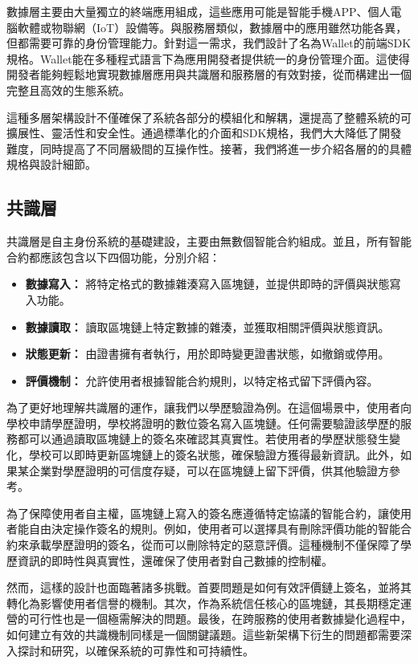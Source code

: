 數據層主要由大量獨立的終端應用組成，這些應用可能是智能手機APP、個人電腦軟體或物聯網（IoT）設備等。與服務層類似，數據層中的應用雖然功能各異，但都需要可靠的身份管理能力。針對這一需求，我們設計了名為Wallet的前端SDK規格。Wallet能在多種程式語言下為應用開發者提供統一的身份管理介面。這使得開發者能夠輕鬆地實現數據層應用與共識層和服務層的有效對接，從而構建出一個完整且高效的生態系統。

這種多層架構設計不僅確保了系統各部分的模組化和解耦，還提高了整體系統的可擴展性、靈活性和安全性。通過標準化的介面和SDK規格，我們大大降低了開發難度，同時提高了不同層級間的互操作性。接著，我們將進一步介紹各層的的具體規格與設計細節。
\subsection{共識層}
共識層是自主身份系統的基礎建設，主要由無數個智能合約組成。並且，所有智能合約都應該包含以下四個功能，分別介紹：
\begin{itemize}
  \item \textbf{數據寫入：} 將特定格式的數據雜湊寫入區塊鏈，並提供即時的評價與狀態寫入功能。
  \item \textbf{數據讀取：} 讀取區塊鏈上特定數據的雜湊，並獲取相關評價與狀態資訊。
  \item \textbf{狀態更新：} 由證書擁有者執行，用於即時變更證書狀態，如撤銷或停用。
  \item \textbf{評價機制：} 允許使用者根據智能合約規則，以特定格式留下評價內容。
\end{itemize}
為了更好地理解共識層的運作，讓我們以學歷驗證為例。在這個場景中，使用者向學校申請學歷證明，學校將證明的數位簽名寫入區塊鏈。任何需要驗證該學歷的服務都可以通過讀取區塊鏈上的簽名來確認其真實性。若使用者的學歷狀態發生變化，學校可以即時更新區塊鏈上的簽名狀態，確保驗證方獲得最新資訊。此外，如果某企業對學歷證明的可信度存疑，可以在區塊鏈上留下評價，供其他驗證方參考。

為了保障使用者自主權，區塊鏈上寫入的簽名應遵循特定協議的智能合約，讓使用者能自由決定操作簽名的規則。例如，使用者可以選擇具有刪除評價功能的智能合約來承載學歷證明的簽名，從而可以刪除特定的惡意評價。這種機制不僅保障了學歷資訊的即時性與真實性，還確保了使用者對自己數據的控制權。

然而，這樣的設計也面臨著諸多挑戰。首要問題是如何有效評價鏈上簽名，並將其轉化為影響使用者信譽的機制。其次，作為系統信任核心的區塊鏈，其長期穩定運營的可行性也是一個極需解決的問題。最後，在跨服務的使用者數據變化過程中，如何建立有效的共識機制同樣是一個關鍵議題。這些新架構下衍生的問題都需要深入探討和研究，以確保系統的可靠性和可持續性。

